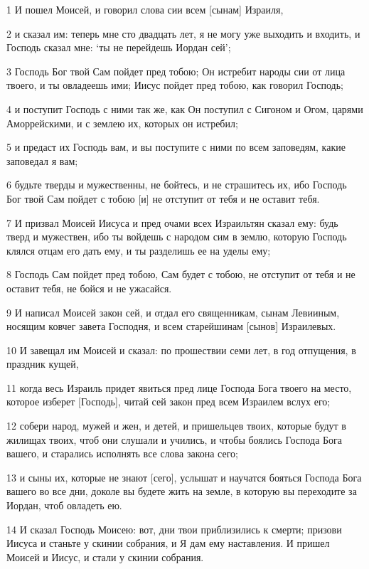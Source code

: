 \par 1 И пошел Моисей, и говорил слова сии всем [сынам] Израиля,
\par 2 и сказал им: теперь мне сто двадцать лет, я не могу уже выходить и входить, и Господь сказал мне: `ты не перейдешь Иордан сей';
\par 3 Господь Бог твой Сам пойдет пред тобою; Он истребит народы сии от лица твоего, и ты овладеешь ими; Иисус пойдет пред тобою, как говорил Господь;
\par 4 и поступит Господь с ними так же, как Он поступил с Сигоном и Огом, царями Аморрейскими, и с землею их, которых он истребил;
\par 5 и предаст их Господь вам, и вы поступите с ними по всем заповедям, какие заповедал я вам;
\par 6 будьте тверды и мужественны, не бойтесь, и не страшитесь их, ибо Господь Бог твой Сам пойдет с тобою [и] не отступит от тебя и не оставит тебя.
\par 7 И призвал Моисей Иисуса и пред очами всех Израильтян сказал ему: будь тверд и мужествен, ибо ты войдешь с народом сим в землю, которую Господь клялся отцам его дать ему, и ты разделишь ее на уделы ему;
\par 8 Господь Сам пойдет пред тобою, Сам будет с тобою, не отступит от тебя и не оставит тебя, не бойся и не ужасайся.
\par 9 И написал Моисей закон сей, и отдал его священникам, сынам Левииным, носящим ковчег завета Господня, и всем старейшинам [сынов] Израилевых.
\par 10 И завещал им Моисей и сказал: по прошествии семи лет, в год отпущения, в праздник кущей,
\par 11 когда весь Израиль придет явиться пред лице Господа Бога твоего на место, которое изберет [Господь], читай сей закон пред всем Израилем вслух его;
\par 12 собери народ, мужей и жен, и детей, и пришельцев твоих, которые будут в жилищах твоих, чтоб они слушали и учились, и чтобы боялись Господа Бога вашего, и старались исполнять все слова закона сего;
\par 13 и сыны их, которые не знают [сего], услышат и научатся бояться Господа Бога вашего во все дни, доколе вы будете жить на земле, в которую вы переходите за Иордан, чтоб овладеть ею.
\par 14 И сказал Господь Моисею: вот, дни твои приблизились к смерти; призови Иисуса и станьте у скинии собрания, и Я дам ему наставления. И пришел Моисей и Иисус, и стали у скинии собрания.
